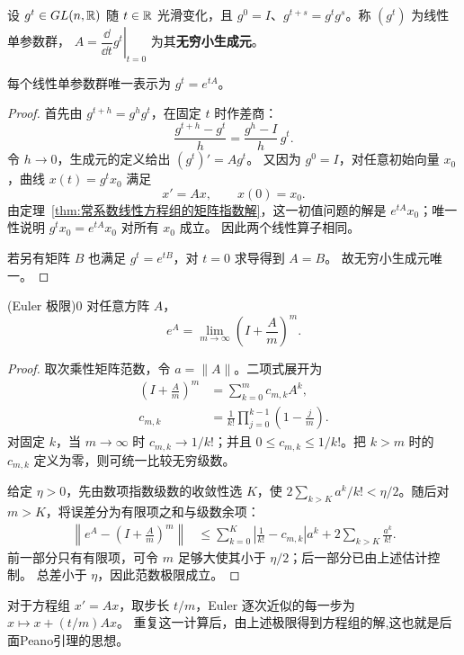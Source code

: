 \begin{definition}[线性单参数群]
设 $g^t\in GL(n,\mathbb{R})$ 随 $t\in\mathbb{R}$ 光滑变化，且
$g^0=I$、$g^{t+s}=g^tg^s$。称 $(g^t)$ 为线性单参数群，
$A=\left.\dfrac{\dd}{\dd t}g^t\right|_{t=0}$ 为其\textbf{无穷小生成元}。
\end{definition}
\begin{theorem}
每个线性单参数群唯一表示为 $g^t=e^{tA}$。
\end{theorem}
\begin{proof}
首先由 $g^{t+h}=g^hg^t$，在固定 $t$ 时作差商：
\[
 \frac{g^{t+h}-g^t}{h}=\frac{g^h-I}{h}\,g^t.
\]
令 $h\to0$，生成元的定义给出 $(g^t)'=Ag^t$。
又因为 $g^0=I$，对任意初始向量 $x_0$，曲线 $x(t)=g^tx_0$ 满足
\[
 x'=Ax,\qquad x(0)=x_0.
\]
由定理~\ref{thm:常系数线性方程组的矩阵指数解}，这一初值问题的解是
$e^{tA}x_0$；唯一性说明 $g^tx_0=e^{tA}x_0$ 对所有 $x_0$ 成立。
因此两个线性算子相同。

若另有矩阵 $B$ 也满足 $g^t=e^{tB}$，对 $t=0$ 求导得到 $A=B$。
故无穷小生成元唯一。
\end{proof}

\begin{theorem}(Euler 极限)0
对任意方阵 $A$，
\[
 e^A=\lim_{m\to\infty}\left(I+\frac Am\right)^m.
\]
\end{theorem}
\begin{proof}
取次乘性矩阵范数，令 $a=\|A\|$。二项式展开为
\[
 \begin{aligned}
 \left(I+\frac Am\right)^m&=\sum_{k=0}^m c_{m,k}A^k,\\
 c_{m,k}&=\frac1{k!}\prod_{j=0}^{k-1}\left(1-\frac jm\right).
\end{aligned}
\]
对固定 $k$，当 $m\to\infty$ 时 $c_{m,k}\to1/k!$；并且
$0\leq c_{m,k}\leq1/k!$。把 $k>m$ 时的 $c_{m,k}$ 定义为零，则可统一比较无穷级数。

给定 $\eta>0$，先由数项指数级数的收敛性选 $K$，使
$2\sum_{k>K}a^k/k!<\eta/2$。随后对 $m>K$，将误差分为有限项之和与级数余项：
\begin{align*}
 \left\|e^A-\left(I+\frac Am\right)^m\right\|
 &\leq\sum_{k=0}^K\left|\frac1{k!}-c_{m,k}\right|a^k
       +2\sum_{k>K}\frac{a^k}{k!}.
\end{align*}
前一部分只有有限项，可令 $m$ 足够大使其小于 $\eta/2$；后一部分已由上述估计控制。
总差小于 $\eta$，因此范数极限成立。
\end{proof}
对于方程组 $x'=Ax$，取步长 $t/m$，Euler 逐次近似的每一步为 $x\mapsto x+(t/m)Ax$。
重复这一计算后，由上述极限得到方程组的解,这也就是后面Peano引理的思想。


